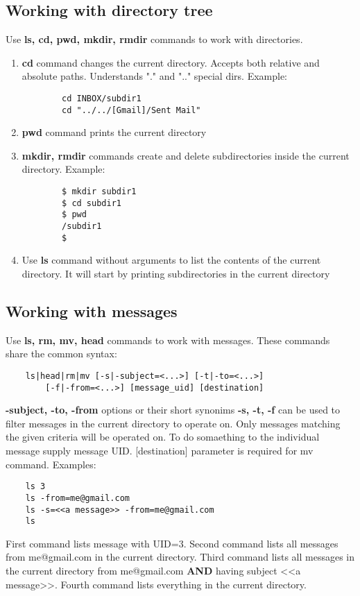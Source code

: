 \documentclass[titlepage]{article}
\begin{document}
\subsection{Working with directory tree}
Use \textbf{ls, cd, pwd, mkdir, rmdir} commands to work with directories. 
\begin{enumerate}
	\item
	\textbf{cd} command changes the current directory. Accepts both relative and absolute paths. 
	Understands "." and ".." special dirs. Example:
	\begin{lstlisting}
		cd INBOX/subdir1
		cd "../../[Gmail]/Sent Mail"
	\end{lstlisting}
	
	\item
	\textbf{pwd} command prints the current directory
	
	\item
	\textbf{mkdir, rmdir} commands create and delete subdirectories inside the current directory. Example:
	\begin{lstlisting}
		$ mkdir subdir1
		$ cd subdir1
		$ pwd
		/subdir1
		$
	\end{lstlisting}
	
	\item
	Use \textbf{ls} command without arguments to list the contents of the current directory. It will
	start by printing subdirectories in the current directory
\end{enumerate}

\subsection{Working with messages}
Use \textbf{ls, rm, mv, head} commands to work with messages. These commands share the common syntax:
\begin{lstlisting}
	ls|head|rm|mv [-s|-subject=<...>] [-t|-to=<...>] 
		[-f|-from=<...>] [message_uid] [destination]
\end{lstlisting}
\textbf{-subject, -to, -from} options or their short synonims \textbf{-s, -t, -f} can be used
to filter messages in the current directory to operate on. Only messages matching the given 
criteria will be operated on. To do somaething to the individual message supply message UID. 
[destination] parameter is required for mv command. Examples:
\begin{lstlisting}
	ls 3
	ls -from=me@gmail.com
	ls -s=<<a message>> -from=me@gmail.com
	ls
\end{lstlisting}
First command lists message with UID=3. Second command lists all messages from me@gmail.com
in the current directory. Third command lists all messages in the current directory from
me@gmail.com \textbf{AND} having subject <<a message>>. Fourth command lists everything in
the current directory.
\end{document}
